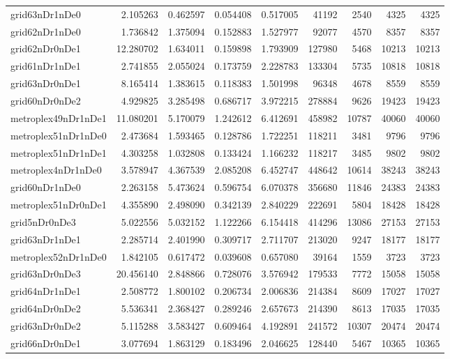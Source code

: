 \begin{longtable}{|l|r|r|r|r|r|r|r|r|}
grid63nDr1nDe0 & 2.105263 & 0.462597 & 0.054408 & 0.517005 & 41192 & 2540 & 4325 & 4325 \\
grid62nDr1nDe0 & 1.736842 & 1.375094 & 0.152883 & 1.527977 & 92077 & 4570 & 8357 & 8357 \\
grid62nDr0nDe1 & 12.280702 & 1.634011 & 0.159898 & 1.793909 & 127980 & 5468 & 10213 & 10213 \\
grid61nDr1nDe1 & 2.741855 & 2.055024 & 0.173759 & 2.228783 & 133304 & 5735 & 10818 & 10818 \\
grid63nDr0nDe1 & 8.165414 & 1.383615 & 0.118383 & 1.501998 & 96348 & 4678 & 8559 & 8559 \\
grid60nDr0nDe2 & 4.929825 & 3.285498 & 0.686717 & 3.972215 & 278884 & 9626 & 19423 & 19423 \\
metroplex49nDr1nDe1 & 11.080201 & 5.170079 & 1.242612 & 6.412691 & 458982 & 10787 & 40060 & 40060 \\
metroplex51nDr1nDe0 & 2.473684 & 1.593465 & 0.128786 & 1.722251 & 118211 & 3481 & 9796 & 9796 \\
metroplex51nDr1nDe1 & 4.303258 & 1.032808 & 0.133424 & 1.166232 & 118217 & 3485 & 9802 & 9802 \\
metroplex4nDr1nDe0 & 3.578947 & 4.367539 & 2.085208 & 6.452747 & 448642 & 10614 & 38243 & 38243 \\
grid60nDr1nDe0 & 2.263158 & 5.473624 & 0.596754 & 6.070378 & 356680 & 11846 & 24383 & 24383 \\
metroplex51nDr0nDe1 & 4.355890 & 2.498090 & 0.342139 & 2.840229 & 222691 & 5804 & 18428 & 18428 \\
grid5nDr0nDe3 & 5.022556 & 5.032152 & 1.122266 & 6.154418 & 414296 & 13086 & 27153 & 27153 \\
grid63nDr1nDe1 & 2.285714 & 2.401990 & 0.309717 & 2.711707 & 213020 & 9247 & 18177 & 18177 \\
metroplex52nDr1nDe0 & 1.842105 & 0.617472 & 0.039608 & 0.657080 & 39164 & 1559 & 3723 & 3723 \\
grid63nDr0nDe3 & 20.456140 & 2.848866 & 0.728076 & 3.576942 & 179533 & 7772 & 15058 & 15058 \\
grid64nDr1nDe1 & 2.508772 & 1.800102 & 0.206734 & 2.006836 & 214384 & 8609 & 17027 & 17027 \\
grid64nDr0nDe2 & 5.536341 & 2.368427 & 0.289246 & 2.657673 & 214390 & 8613 & 17035 & 17035 \\
grid63nDr0nDe2 & 5.115288 & 3.583427 & 0.609464 & 4.192891 & 241572 & 10307 & 20474 & 20474 \\
grid66nDr0nDe1 & 3.077694 & 1.863129 & 0.183496 & 2.046625 & 128440 & 5467 & 10365 & 10365 \\

\end{longtable}
